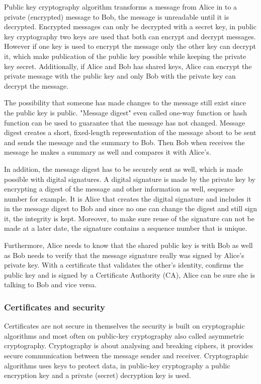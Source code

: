 Public key cryptography algorithm transforms a message from Alice in to a private (encrypted) message to Bob, 
the message is unreadable until it is decrypted. 
Encrypted messages can only be decrypted with a secret key, in public key cryptography two keys are used that both can encrypt and 
decrypt messages. 
However if one key is used to encrypt the message only the other key can decrypt it, which make publication of the public key 
possible while keeping the private key secret. 
Additionally, if Alice and Bob has shared keys, Alice can encrypt the private message with the public key and only Bob 
with the private key can decrypt the message.

The possibility that someone has made changes to the message still exist since the public key is public. 
"Message digest" even called one-way function or hash function can be used to guarantee that the message has not changed. 
Message digest creates a short, fixed-length representation of the message about to be sent and sends the message and
the summary to Bob.
Then Bob when receives the message he makes a summary as well and compares it with Alice's.

In addition, the message digest has to be securely sent as well, which is made possible with digital signatures. A digital signature
is made by the private key by encrypting a digest of the message and other information as well, sequence number for example.
It is Alice that creates the digital signature and includes it in the message digest to Bob and since no one can change the digest and still 
sign it, the integrity is kept. Moreover, to make sure reuse of the signature can not be made at a later date, the signature contains a 
sequence number that is unique. 

Furthermore, Alice needs to know that the shared public key is with Bob as well as Bob needs to verify that the message signature 
really was signed by Alice's private key. With a certificate that validates the other's identity, confirms the public key and
is signed by a Certificate Authority (CA), Alice can be sure she is talking to Bob and vice versa.

\subsubsection{Certificates and security}
Certificates are not secure in themselves the security is built on cryptographic algorithms and most often on public-key cryptography also called asymmetric cryptography.
Cryptography is about analysing and breaking ciphers, it provides secure communication between the message sender and receiver. 
Cryptographic algorithms uses keys to protect data, in public-key cryptography a public encryption key and a private (secret) decryption key is used.\cite[p.~252]{book:computer-security}

